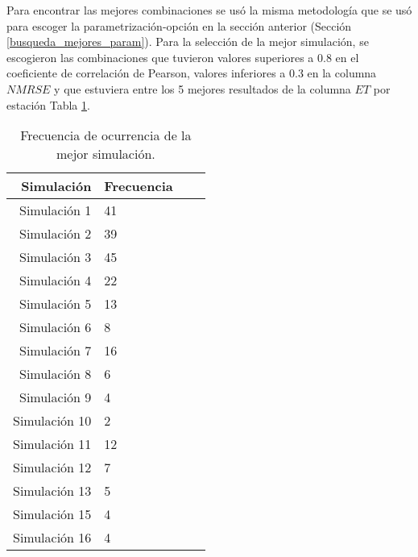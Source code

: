 Para encontrar las mejores combinaciones se usó la misma metodología que se usó para escoger la parametrización-opción en la sección anterior (Sección \ref{busqueda_mejores_param}). Para la selección de la mejor simulación, se escogieron las combinaciones que tuvieron valores superiores a 0.8 en el coeficiente de correlación de Pearson, valores inferiores a 0.3 en la columna $NMRSE$ y que estuviera entre los 5 mejores resultados de la columna $ET$ por estación Tabla \ref{tabla:resultado_tiempo}.\\


\begin{table}[H]
    \centering
    \caption{Frecuencia de ocurrencia de la mejor simulación.}
    \label{tabla:resultado_tiempo}
\begin{tabular}{rlrr}
\toprule
 Simulación &  Frecuencia \\
\midrule
Simulación 1  &     41 \\
Simulación 2  &     39 \\
Simulación 3  &     45 \\
Simulación 4  &     22 \\
Simulación 5  &     13 \\
Simulación 6  &      8 \\
Simulación 7  &     16 \\
Simulación 8  &      6 \\
Simulación 9  &      4 \\
Simulación 10 &      2 \\
Simulación 11 &     12 \\
Simulación 12 &      7 \\
Simulación 13 &      5 \\
Simulación 15 &      4 \\
Simulación 16 &      4 \\

\bottomrule
\end{tabular}
\end{table}

